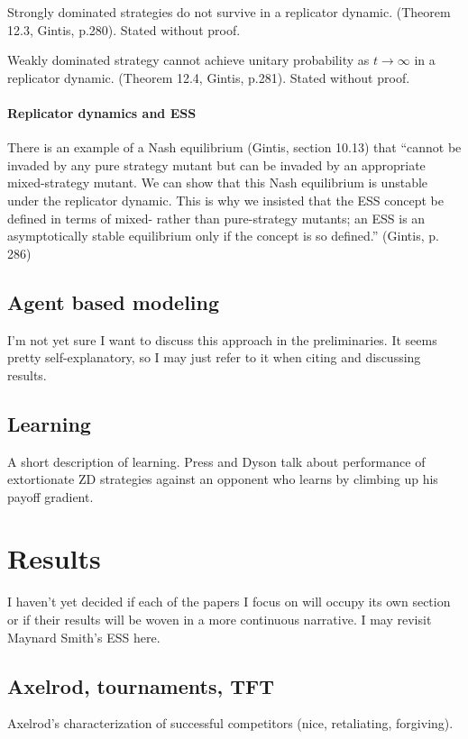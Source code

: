 \begin{theorem}
Strongly dominated strategies do not survive in a replicator dynamic. (Theorem 12.3, Gintis, p.280). Stated without proof.
\end{theorem}
\begin{theorem}
Weakly dominated strategy cannot achieve unitary probability as $t \rightarrow \infty$ in a replicator dynamic. (Theorem 12.4, Gintis, p.281). Stated without proof.
\end{theorem}


\subsubsection{Replicator dynamics and ESS}
There is an example of a Nash equilibrium (Gintis, section 10.13) that ``cannot be invaded by any pure strategy mutant but can be invaded by an appropriate mixed-strategy mutant. We can show that this Nash equilibrium is unstable under the replicator dynamic. This is why we insisted that the ESS concept be defined in terms of mixed- rather than pure-strategy mutants; an ESS is an asymptotically stable equilibrium only if the concept is so defined.'' (Gintis, p. 286)

\section{Agent based modeling}
I'm not yet sure I want to discuss this approach in the preliminaries. It seems pretty self-explanatory, so I may just refer to it when citing and discussing results.

\section{Learning}
A short description of learning. Press and Dyson talk about performance of extortionate ZD strategies against an opponent who learns by climbing up his payoff gradient.

\chapter{Results}
I haven't yet decided if each of the papers I focus on will occupy its own section or if their results will be woven in a more continuous narrative. I may revisit Maynard Smith's ESS here.

\section{Axelrod, tournaments, TFT}
Axelrod's characterization of successful competitors (nice, retaliating, forgiving).

